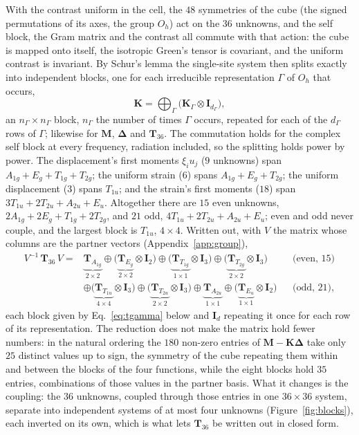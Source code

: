 \documentclass[11pt,a4paper]{article}
\newcommand{\bK}{\mathbf{K}}
\newcommand{\bM}{\mathbf{M}}
\newcommand{\bT}{\mathbf{T}}
\newcommand{\bI}{\mathbf{I}}
\newcommand{\bD}{\boldsymbol{\Delta}}
\begin{document}
With the contrast uniform in the cell, the $48$ symmetries of the cube (the signed permutations of its
axes, the group $O_h$) act on the $36$ unknowns, and the self block, the Gram matrix and the contrast all
commute with that action: the cube is mapped onto itself, the isotropic Green's tensor is covariant, and the
uniform contrast is invariant. By Schur's lemma the single-site system then splits exactly into independent
blocks, one for each irreducible representation $\Gamma$ of $O_h$ that occurs,
\begin{equation}\label{eq:schur}
  \bK=\bigoplus_\Gamma\bigl(\bK_\Gamma\otimes\bI_{d_\Gamma}\bigr),
\end{equation}
an $n_\Gamma\times n_\Gamma$ block, $n_\Gamma$ the number of times $\Gamma$ occurs, repeated for each of the
$d_\Gamma$ rows of $\Gamma$; likewise for $\bM$, $\bD$ and $\bT_{36}$. The commutation holds for the complex
self block at every frequency, radiation included, so the splitting holds power by power. The displacement's
first moments $\xi_iu_j$ ($9$ unknowns) span $A_{1g}+E_g+T_{1g}+T_{2g}$; the uniform strain ($6$) spans
$A_{1g}+E_g+T_{2g}$; the uniform displacement ($3$) spans $T_{1u}$; and the strain's first moments ($18$)
span $3T_{1u}+2T_{2u}+A_{2u}+E_u$. Altogether there are $15$ even unknowns,
$2A_{1g}+2E_g+T_{1g}+2T_{2g}$, and $21$ odd, $4T_{1u}+2T_{2u}+A_{2u}+E_u$; even and odd never couple, and the
largest block is $T_{1u}$, $4\times4$. Written out, with $V$ the matrix whose columns are the partner
vectors (Appendix~\ref{app:group}),
\begin{equation}\label{eq:t36blocks}
\begin{aligned}
  V^{-1}\,\bT_{36}\,V={}&\underbrace{\bT_{A_{1g}}}_{2\times2}\oplus
  \bigl(\underbrace{\bT_{E_g}}_{2\times2}\otimes\bI_2\bigr)\oplus
  \bigl(\underbrace{\bT_{T_{1g}}}_{1\times1}\otimes\bI_3\bigr)\oplus
  \bigl(\underbrace{\bT_{T_{2g}}}_{2\times2}\otimes\bI_3\bigr)
  &&\text{(even, $15$)}\\
  &\oplus\bigl(\underbrace{\bT_{T_{1u}}}_{4\times4}\otimes\bI_3\bigr)\oplus
  \bigl(\underbrace{\bT_{T_{2u}}}_{2\times2}\otimes\bI_3\bigr)\oplus
  \underbrace{\bT_{A_{2u}}}_{1\times1}\oplus
  \bigl(\underbrace{\bT_{E_u}}_{1\times1}\otimes\bI_2\bigr)
  &&\text{(odd, $21$)},
\end{aligned}
\end{equation}
each block given by Eq.~\eqref{eq:tgamma} below and $\bI_d$ repeating it once for each row of its
representation. The reduction does not make the matrix hold fewer numbers: in the natural ordering the
$180$ non-zero entries of $\bM-\bK\bD$ take only $25$ distinct values up to sign, the symmetry of the cube
repeating them within and between the blocks of the four functions, while the eight blocks hold $35$
entries, combinations of those values in the partner basis. What it changes is the coupling: the $36$
unknowns, coupled through those entries in one $36\times36$ system, separate into independent systems of at
most four unknowns (Figure~\ref{fig:blocks}), each inverted on its own, which is what lets $\bT_{36}$ be
written out in closed form.
\end{document}
